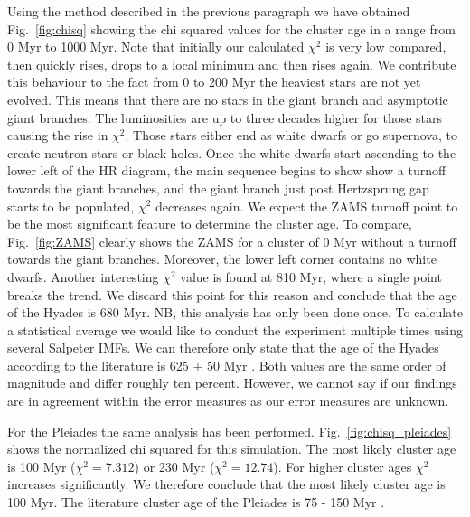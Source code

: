 \documentclass{aa}
\begin{document}
Using the method described in the previous paragraph we have obtained Fig.~\ref{fig:chisq} showing the chi squared values for the cluster age in a range from 0 Myr to 1000 Myr. Note that initially our calculated $\chi^2$ is very low compared, then quickly rises, drops to a local minimum and then rises again. We contribute this behaviour to the fact from 0 to 200 Myr the heaviest stars are not yet evolved. This means that there are no stars in the giant branch and asymptotic giant branches. The luminosities are up to three decades higher for those stars causing the rise in $\chi^2$. Those stars either end as white dwarfs or go supernova, to create neutron stars or black holes. Once the white dwarfs start ascending to the lower left of the HR diagram, the main sequence begins to show show a turnoff towards the giant branches, and the giant branch just post Hertzsprung gap starts to be populated, $\chi^2$ decreases again. We expect the ZAMS turnoff point to be the most significant feature to determine the cluster age. To compare, Fig.~\ref{fig:ZAMS} clearly shows the ZAMS for a cluster of 0 Myr without a turnoff towards the giant branches. Moreover, the lower left corner contains no white dwarfs. Another interesting $\chi^2$ value is found at 810 Myr, where a single point breaks the trend. We discard this point for this reason and conclude that the age of the Hyades is 680 Myr. NB, this analysis has only been done once. To calculate a statistical average we would like to conduct the experiment multiple times using several Salpeter IMFs. We can therefore only state that the age of the Hyades according to the literature is 625 $\pm$ 50 Myr \citep{1998A&A...331...81P}. Both values are the same order of magnitude and differ roughly ten percent. However, we cannot say if our findings are in agreement within the error measures as our error measures are unknown.

For the Pleiades the same analysis has been performed. Fig.~\ref{fig:chisq_pleiades} shows the normalized chi squared for this simulation. The most likely cluster age is 100 Myr ($\chi^2 = 7.312$) or 230 Myr ($\chi^2 = 12.74$). For higher cluster ages $\chi^2$ increases significantly. We therefore conclude that the most likely cluster age is 100 Myr. The literature cluster age of the Pleiades is 75 - 150 Myr \citep[e.g.][]{1998ApJ...497..253U}.
\end{document}
